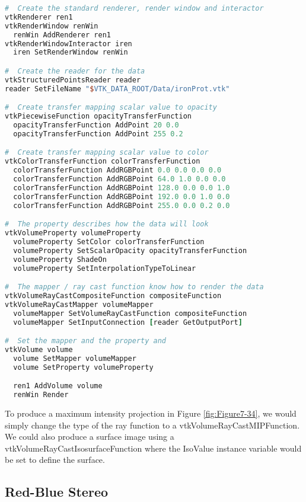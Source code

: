 \begin{lstlisting}[language=TCL, caption={Volume rendering of a high potential iron protein.}]
#  Create the standard renderer, render window and interactor
vtkRenderer ren1
vtkRenderWindow renWin
  renWin AddRenderer ren1
vtkRenderWindowInteractor iren
  iren SetRenderWindow renWin

#  Create the reader for the data
vtkStructuredPointsReader reader
reader SetFileName "$VTK_DATA_ROOT/Data/ironProt.vtk"

#  Create transfer mapping scalar value to opacity
vtkPiecewiseFunction opacityTransferFunction
  opacityTransferFunction AddPoint 20 0.0
  opacityTransferFunction AddPoint 255 0.2

#  Create transfer mapping scalar value to color
vtkColorTransferFunction colorTransferFunction
  colorTransferFunction AddRGBPoint 0.0 0.0 0.0 0.0
  colorTransferFunction AddRGBPoint 64.0 1.0 0.0 0.0
  colorTransferFunction AddRGBPoint 128.0 0.0 0.0 1.0
  colorTransferFunction AddRGBPoint 192.0 0.0 1.0 0.0
  colorTransferFunction AddRGBPoint 255.0 0.0 0.2 0.0

#  The property describes how the data will look
vtkVolumeProperty volumeProperty
  volumeProperty SetColor colorTransferFunction
  volumeProperty SetScalarOpacity opacityTransferFunction
  volumeProperty ShadeOn
  volumeProperty SetInterpolationTypeToLinear

#  The mapper / ray cast function know how to render the data
vtkVolumeRayCastCompositeFunction compositeFunction
vtkVolumeRayCastMapper volumeMapper
  volumeMapper SetVolumeRayCastFunction compositeFunction
  volumeMapper SetInputConnection [reader GetOutputPort]

#  Set the mapper and the property and
vtkVolume volume
  volume SetMapper volumeMapper
  volume SetProperty volumeProperty

  ren1 AddVolume volume
  renWin Render
\end{lstlisting}

To produce a maximum intensity projection in Figure \ref{fig:Figure7-34}, we would simply change the type of the ray function to a vtkVolumeRayCastMIPFunction. We could also produce a surface image using a vtkVolumeRayCastIsosurfaceFunction where the IsoValue instance variable would be set to define the surface.


\subsection{Red-Blue Stereo}

